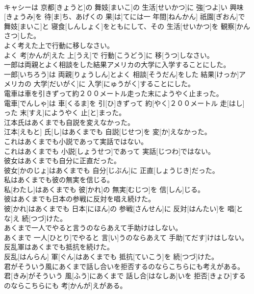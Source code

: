 \documentclass[8pt]{extreport}
\begin{document}
\begin{CJK}{UTF8}{min}
\\	キャシーは 京都[きょうと]の 舞妓[まいこ]の 生活[せいかつ]に 強[つよ]い 興味[きょうみ]を 待[ま]ち、あげくの 果[は]てには一 年間[ねんかん] 祇園[ぎおん]で 舞妓[まいこ]と 寝食[しんしょく]をともにして、その 生活[せいかつ]を 観察[かんさつ]した。
\\	よく考えた上で行動に移しなさい。	
\\	よく 考[かんが]えた 上[うえ]で 行動[こうどう]に 移[うつ]しなさい。
\\	一郎は両親とよく相談をした結果アメリカの大学に入学することにした。	
\\	一郎[いちろう]は 両親[りょうしん]とよく 相談[そうだん]をした 結果[けっか]アメリカの 大学[だいがく]に 入学[にゅうがく]することにした。
\\	電車は車を引きずって約２００メートル走った末にようやく止まった。	
\\	電車[でんしゃ]は 車[くるま]を 引[ひ]きずって 約[やく]２００メートル 走[はし]った 末[すえ]にようやく 止[と]まった。
\\	江本氏はあくまでも自説を変えなかった。	
\\	江本[えもと] 氏[し]はあくまでも 自説[じせつ]を 変[か]えなかった。
\\	これはあくまでも小説であって実話ではない。	
\\	これはあくまでも 小説[しょうせつ]であって 実話[じつわ]ではない。
\\	彼女はあくまでも自分に正直だった。	
\\	彼女[かのじょ]はあくまでも 自分[じぶん]に 正直[しょうじき]だった。
\\	私はあくまでも彼の無実を信じる。	
\\	私[わたし]はあくまでも 彼[かれ]の 無実[むじつ]を 信[しん]じる。
\\	彼はあくまでも日本の参戦に反対を唱え続けた。	
\\	彼[かれ]はあくまでも 日本[にほん]の 参戦[さんせん]に 反対[はんたい]を 唱[とな]え 続[つづ]けた。
\\	あくまで一人でやると言うのならあえて手助けはしない。	
\\	あくまで 一人[ひとり]でやると 言[い]うのならあえて 手助[てだす]けはしない。
\\	反乱軍はあくまでも抵抗を続けた。	
\\	反乱[はんらん] 軍[ぐん]はあくまでも 抵抗[ていこう]を 続[つづ]けた。
\\	君がそういう風にあくまで話し合いを拒否するのならこちらにも考えがある。	
\\	君[きみ]がそういう 風[ふう]にあくまで 話し合[はなしあ]いを 拒否[きょひ]するのならこちらにも 考[かんが]えがある。

\end{CJK}
\end{document}
